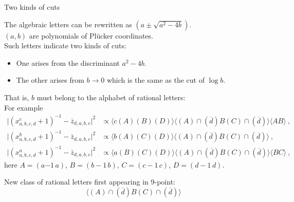 \documentclass[10pt]{beamer}
\begin{document}
\begin{frame}{Two kinds of cuts}
  
  The algebraic letters can be rewritten as $(a\pm \sqrt{a^{2}-4b})$.\\
  $(a,b)$ are polynomials of Pl\"{u}cker coordinates. \\
  Such letters indicate two kinds of cuts:
  \begin{itemize}
    \item One arises from the discriminant $a^{2}-4b$.
    \item The other arises from $b\to0$ which is the same as the cut of $\log b$. 
  \end{itemize}
That is, $b$ must belong to the alphabet of \alert{rational letters}:\\
For example {\footnotesize{
\begin{equation*}
  \begin{aligned}
  \bigl|(x^{c}_{a,b,c,d}+1)^{-1}-\bar{z}_{d,a,b,c}\bigr|^{2}&\propto\langle c(A)(B)(D)\rangle\langle(A) \cap(\overline{d}) B(C) \cap(\overline{d})\rangle\langle A B\rangle \:,\\
  \bigl|(x^{b}_{a,b,c,d}+1)^{-1}-\bar{z}_{d,a,b,c}\bigr|^{2}&\propto \langle b(A)(C)(D)\rangle\langle(A) \cap(\overline{d}) B(C) \cap(\overline{d})\rangle \:, \\
  \bigl|(x^{a}_{a,b,c,d}+1)^{-1}-\bar{z}_{d,a,b,c}\bigr|^{2}&\propto \langle a(B)(C)(D)\rangle\langle(A) \cap(\overline{d}) B(C) \cap(\overline{d})\rangle\langle B C\rangle \:,
  \end{aligned} 
\end{equation*}
}}
here $A=(a{-1}\,a)$, $B=(b{-}1\,b)$, $C=(c{-}1\,c)$, $D=(d{-}1\,d)$.

New class of rational letters first appearing in 9-point: \[
  \langle(A) \cap(\overline{d}) B(C) \cap(\overline{d})\rangle\]
\end{frame}
\end{document}
